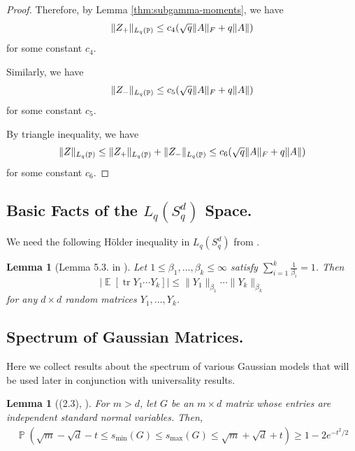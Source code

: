 \documentclass[11pt]{amsart}
\numberwithin{equation}{section}
\numberwithin{equation}{section}
\DeclareMathOperator{\E}{\mathbb{E}}
\DeclareMathOperator{\Pb}{\mathbb{P}}
\DeclareMathOperator*{\tr}{tr}
\DeclarePairedDelimiter{\norm}{\lVert}{\rVert}
\newtheorem{lemma}[theorem]{Lemma}
\begin{document}
\begin{proof}
Therefore, by Lemma \ref{thm:subgamma-moments}, we have
\begin{align*}
    \norm{Z_+}_{L_q(\Pb)} \le c_4(\sqrt{q}\|A\|_F +q\|A\|)
\end{align*}
for some constant $c_4$.

Similarly, we have
\begin{align*}
    \norm{Z_-}_{L_q(\Pb)} \le c_5(\sqrt{q}\|A\|_F +q\|A\|)
\end{align*}
for some constant $c_5$.

By triangle inequality, we have
\begin{align*}
    \norm{Z}_{L_q(\Pb)} \le \norm{Z_+}_{L_q(\Pb)}+ \norm{Z_-}_{L_q(\Pb)} \le c_6(\sqrt{q}\|A\|_F +q\|A\|)
\end{align*}
for some constant $c_6$.






\end{proof}


\bigskip

\subsection{Basic Facts of the $L_q(S_q^d)$ Space.}

We need the following H\"older inequality in $L_q(S_q^d)$ from \cite{brailovskaya2022universality}. 


\begin{lemma}[Lemma 5.3. in \cite{brailovskaya2022universality}]
\label{lem:holdervanhandel}
Let $1\le 
\beta_1,\ldots,\beta_k\le\infty$ satisfy $\sum_{i=1}^k\frac{1}{\beta_i}=1$. Then
$$
	|\E[\tr Y_1\cdots Y_k]| \le
	\|Y_1\|_{\beta_1}\cdots \|Y_k\|_{\beta_k}
$$
for any $d\times d$ random matrices $Y_1,\ldots,Y_k$.
\end{lemma}

\subsection{Spectrum of Gaussian Matrices.}
Here we collect results about the spectrum of various Gaussian models that will be used later in conjunction with universality results.



   \begin{lemma}[(2.3), \cite{rudelson2010non}]\label{lem:Gaussianspectrum}
    For $m>d$, let $G$ be an $m \times d$ matrix whose entries are independent standard normal variables. Then,
    \begin{align*}
        \Pb(\sqrt{m}-\sqrt{d}-t \leq s_{\min}(G) \leq s_{\max}(G) \leq \sqrt{m}+\sqrt{d}+t) \geq 1 - 2e^{-t^2/2}
    \end{align*}
\end{lemma}
\end{document}
